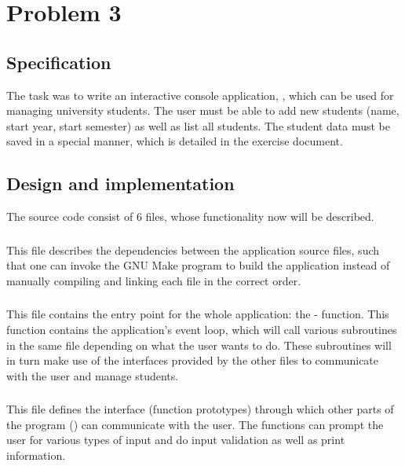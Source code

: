 \section*{Problem 3}
\subsection*{Specification}
The task was to write an interactive console application, ,
which can be used for managing university students. The user must be able
to add new students (name, start year, start semester) as well as
list all students. The student data must be saved in a special manner,
which is detailed in the exercise document.

\subsection*{Design and implementation}
The source code consist of 6 files, whose functionality now will be described.

\subsubsection*{}
This file describes the dependencies between the application
source files, such that one can invoke the GNU Make program to build the application
instead of manually compiling and linking each file in the correct order.

\subsubsection*{}
This file contains the entry point for the whole application: the -
function. This function contains the application's event loop, which will call various
subroutines in the same file depending on what the user wants to do. These subroutines will
in turn make use of the interfaces provided by the other files to communicate with the user
and manage students.

\subsubsection*{}
This file defines the interface (function prototypes) through 
which other parts of the program () can communicate 
with the user. The functions can prompt the user for various types
of input and do input validation as well as print information.

